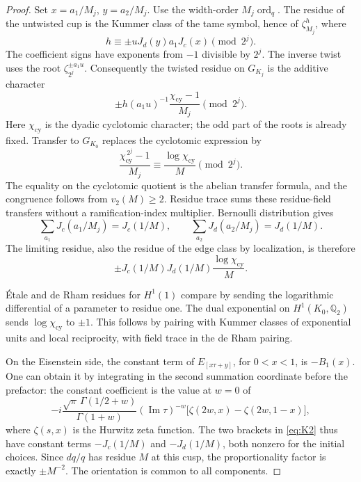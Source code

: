 \begin{proof}
Set \(x=a_1/M_j\), \(y=a_2/M_j\).  Use the width-order
\(M_j\operatorname{ord}_q\).  The residue of the untwisted cup is the
Kummer class of the tame symbol, hence of \(\zeta_{M_j}^{h}\), where
\[
                  h\equiv\pm uJ_d(y)a_1J_c(x)\pmod{2^j}.
\]
The coefficient signs have exponents from \(-1\) divisible by \(2^j\).
The inverse twist uses the root \(\zeta_{2^j}^{\pm a_1u}\).
Consequently the twisted residue on \(G_{K_j}\) is the additive character
\[
          \pm h(a_1u)^{-1}\frac{\chi_{\mathrm{cy}}-1}{M_j}
                       \pmod{2^j}.
\]
Here \(\chi_{\mathrm{cy}}\) is the dyadic cyclotomic character; the odd
part of the roots is already fixed.  Transfer to \(G_{K_0}\) replaces
the cyclotomic expression by
\[
 \frac{\chi_{\mathrm{cy}}^{\,2^j}-1}{M_j}
               \equiv \frac{\log\chi_{\mathrm{cy}}}{M}\pmod{2^j}.
\]
The equality on the cyclotomic quotient is the abelian transfer
formula, and the congruence follows from \(v_2(M)\geq2\).
Residue trace sums these residue-field transfers without a
ramification-index multiplier.  Bernoulli distribution gives
\[
 \sum_{a_1}J_c(a_1/M_j)=J_c(1/M),\qquad
 \sum_{a_2}J_d(a_2/M_j)=J_d(1/M).
\]
The limiting residue, also the residue of the edge class by localization,
is therefore
\[
                  \pm J_c(1/M)J_d(1/M)
                              \frac{\log\chi_{\mathrm{cy}}}{M}.
\]

Étale and de Rham residues for \(H^1(1)\) compare by sending the
logarithmic differential of a parameter to residue one.  The dual
exponential on \(H^1(K_0,\mathbb Q_2)\) sends
\(\log\chi_{\mathrm{cy}}\) to \(\pm1\).  This follows by pairing with
Kummer classes of exponential units and local reciprocity, with field
trace in the de Rham pairing.

On the Eisenstein side, the constant term of \(E_{[x\tau+y]}\), for
\(0<x<1\), is \(-B_1(x)\).  One can obtain it by integrating in the
second summation coordinate before the prefactor: the constant
coefficient is the value at \(w=0\) of
\[
 -i\frac{\sqrt\pi\,\Gamma(1/2+w)}{\Gamma(1+w)}
 (\operatorname{Im}\tau)^{-w}
       \bigl[\zeta(2w,x)-\zeta(2w,1-x)\bigr],
\]
where \(\zeta(s,x)\) is the Hurwitz zeta function.  The two brackets
in \eqref{eq:K2} thus have constant terms
\(-J_c(1/M)\) and \(-J_d(1/M)\), both nonzero for the initial choices.
Since \(dq/q\) has residue \(M\) at this cusp, the proportionality
factor is exactly \(\pm M^{-2}\).  The orientation is common to all
components.


\end{proof}
